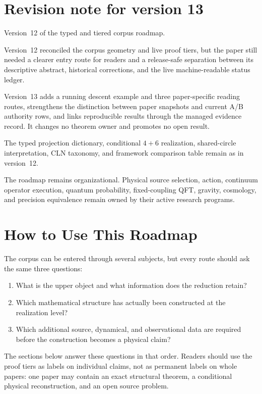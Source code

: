 \documentclass[11pt]{article}
\begin{document}
\section*{Revision note for version 13}
\begin{description}[leftmargin=2.5cm,style=nextline]
\item[Supersedes.]
Version~12 of the typed and tiered corpus roadmap.

\item[Reason.]
Version~12 reconciled the corpus geometry and live proof tiers, but the paper
still needed a clearer entry route for readers and a release-safe separation
between its descriptive abstract, historical corrections, and the live
machine-readable status ledger.

\item[Resolution.]
Version~13 adds a running descent example and three paper-specific reading
routes, strengthens the distinction between paper snapshots and current A/B
authority rows, and links reproducible results through the managed evidence
record. It changes no theorem owner and promotes no open result.

\item[Retained content.]
The typed projection dictionary, conditional $4+6$ realization, shared-circle
interpretation, CLN taxonomy, and framework comparison table remain as in
version~12.

\item[Open boundary.]
The roadmap remains organizational. Physical source selection, action,
continuum operator execution, quantum probability, fixed-coupling QFT,
gravity, cosmology, and precision equivalence remain owned by their active
research programs.
\end{description}

\tableofcontents
\newpage

\section{How to Use This Roadmap}

The corpus can be entered through several subjects, but every route should ask
the same three questions:
\begin{enumerate}[label=\arabic*.]
\item What is the upper object and what information does the reduction retain?
\item Which mathematical structure has actually been constructed at the
realization level?
\item Which additional source, dynamical, and observational data are required
before the construction becomes a physical claim?
\end{enumerate}
The sections below answer these questions in that order.  Readers should use
the proof tiers as labels on individual claims, not as permanent labels on
whole papers: one paper may contain an exact structural theorem, a conditional
physical reconstruction, and an open source problem.
\end{document}

